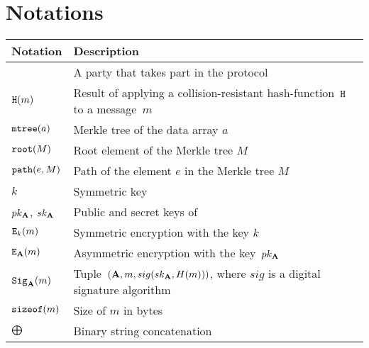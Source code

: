 \appendix
\section{Notations}

\tabulinesep=3pt
\begin{longtabu} to \textwidth {| X[1,r] | X[5,l] |}
  \hline
  \textbf{Notation} &  \textbf{Description}\\ \hline
  \endhead
   & A party that takes part in the protocol \\ \hline
  $\mathtt{H}(m)$ & Result of applying a collision-resistant hash-function~$\mathtt{H}$ to a message~$m$ \\ \hline
  $\mathtt{mtree}(a)$ & Merkle tree of the data array $a$ \\ \hline
  $\mathtt{root}(M)$ & Root element of the Merkle tree $M$ \\ \hline
  $\mathtt{path}(e, M)$ & Path of the element $e$ in the Merkle tree $M$ \\ \hline
  $k$ & Symmetric key \\ \hline
  $pk_{\mathbf{A}}$, $sk_{\mathbf{A}}$ & Public and secret keys of  \\ \hline
  $\mathtt{E}_k(m)$ & Symmetric encryption with the key $k$ \\ \hline
  $\mathtt{E}_{\mathbf{A}}(m)$ & Asymmetric encryption with the key~$pk_{\mathbf{A}}$\\ \hline
  $\mathtt{Sig}_{\mathbf{A}}(m)$ & Tuple~$(\mathbf{A}, m, sig(sk_{\mathbf{A}}, H(m)))$, where $sig$ is a digital signature algorithm \\ \hline
  $\mathtt{sizeof}(m)$ & Size of $m$ in bytes \\ \hline
  $\bigoplus$ & Binary string concatenation \\ \hline
\end{longtabu}
